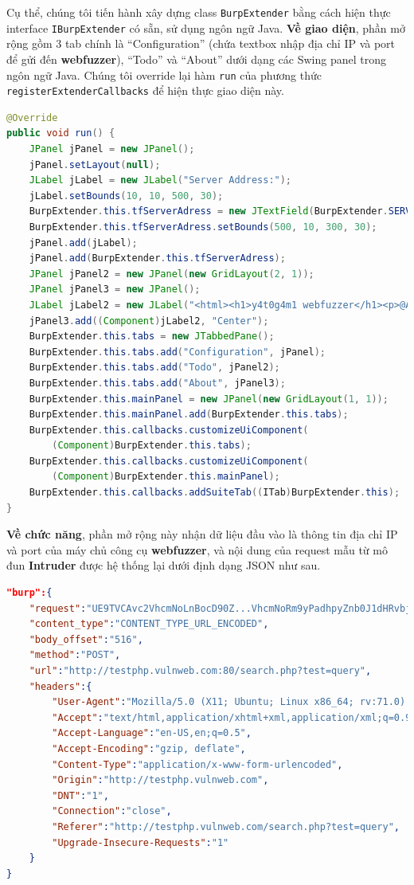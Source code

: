 Cụ thể, chúng tôi tiến hành xây dựng class \texttt{BurpExtender} bằng cách hiện thực interface \texttt{IBurpExtender} có sẵn, sử dụng ngôn ngữ Java. \textbf{Về giao diện}, phần mở rộng gồm 3 tab chính là ``Configuration'' (chứa textbox nhập địa chỉ IP và port để gửi đến \textbf{webfuzzer}), ``Todo'' và ``About'' dưới dạng các Swing panel trong ngôn ngữ Java. Chúng tôi override lại hàm \texttt{run} của phương thức \texttt{registerExtenderCallbacks} để hiện thực giao diện này.\\
\begin{lstlisting}[language=Java]
@Override
public void run() {
    JPanel jPanel = new JPanel();
    jPanel.setLayout(null);
    JLabel jLabel = new JLabel("Server Address:");
    jLabel.setBounds(10, 10, 500, 30);
    BurpExtender.this.tfServerAdress = new JTextField(BurpExtender.SERVERADRESS);
    BurpExtender.this.tfServerAdress.setBounds(500, 10, 300, 30);
    jPanel.add(jLabel);
    jPanel.add(BurpExtender.this.tfServerAdress);
    JPanel jPanel2 = new JPanel(new GridLayout(2, 1));
    JPanel jPanel3 = new JPanel();
    JLabel jLabel2 = new JLabel("<html><h1>y4t0g4m1 webfuzzer</h1><p>@Author: y4t0g4m1</p><p>@Features:</p></html>");
    jPanel3.add((Component)jLabel2, "Center");
    BurpExtender.this.tabs = new JTabbedPane();
    BurpExtender.this.tabs.add("Configuration", jPanel);
    BurpExtender.this.tabs.add("Todo", jPanel2);
    BurpExtender.this.tabs.add("About", jPanel3);
    BurpExtender.this.mainPanel = new JPanel(new GridLayout(1, 1));
    BurpExtender.this.mainPanel.add(BurpExtender.this.tabs);
    BurpExtender.this.callbacks.customizeUiComponent(
        (Component)BurpExtender.this.tabs);
    BurpExtender.this.callbacks.customizeUiComponent(
        (Component)BurpExtender.this.mainPanel);
    BurpExtender.this.callbacks.addSuiteTab((ITab)BurpExtender.this);
}
\end{lstlisting}
\textbf{Về chức năng}, phần mở rộng này nhận dữ liệu đầu vào là thông tin địa chỉ IP và port của máy chủ công cụ \textbf{webfuzzer}, và nội dung của request mẫu từ mô đun \textbf{Intruder} được hệ thống lại dưới định dạng JSON như sau.\\
\begin{lstlisting}[language=json,firstnumber=1]
"burp":{ 
    "request":"UE9TVCAvc2VhcmNoLnBocD90Z...VhcmNoRm9yPadhpyZnb0J1dHRvbj1nbw==",
    "content_type":"CONTENT_TYPE_URL_ENCODED",
    "body_offset":"516",
    "method":"POST",
    "url":"http://testphp.vulnweb.com:80/search.php?test=query",
    "headers":{ 
        "User-Agent":"Mozilla/5.0 (X11; Ubuntu; Linux x86_64; rv:71.0) Gecko/20100101 Firefox/71.0",
        "Accept":"text/html,application/xhtml+xml,application/xml;q=0.9,*/*;q=0.8",
        "Accept-Language":"en-US,en;q=0.5",
        "Accept-Encoding":"gzip, deflate",
        "Content-Type":"application/x-www-form-urlencoded",
        "Origin":"http://testphp.vulnweb.com",
        "DNT":"1",
        "Connection":"close",
        "Referer":"http://testphp.vulnweb.com/search.php?test=query",
        "Upgrade-Insecure-Requests":"1"
    }
}
\end{lstlisting}
